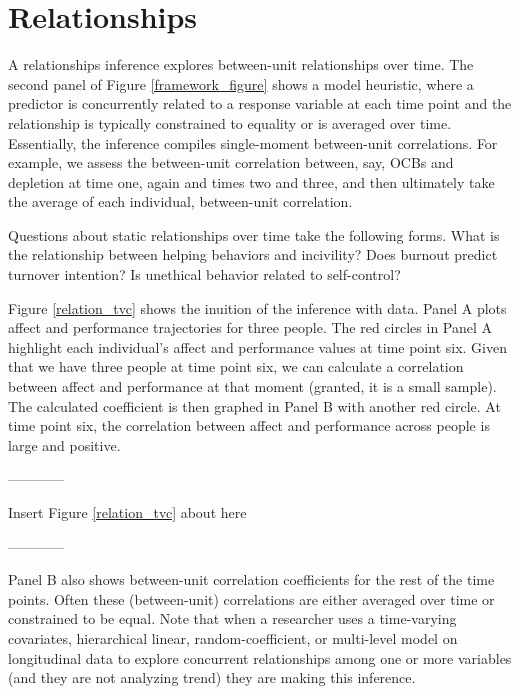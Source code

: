 \documentclass[english,,man]{apa6}
\theoremstyle{definition}
\theoremstyle{definition}
\theoremstyle{definition}
\theoremstyle{remark}
\begin{document}
\hypertarget{relationships}{%
\section{Relationships}\label{relationships}}

A relationships inference explores between-unit relationships over time.
The second panel of Figure \ref{framework_figure} shows a model
heuristic, where a predictor is concurrently related to a response
variable at each time point and the relationship is typically
constrained to equality or is averaged over time. Essentially, the
inference compiles single-moment between-unit correlations. For example,
we assess the between-unit correlation between, say, OCBs and depletion
at time one, again and times two and three, and then ultimately take the
average of each individual, between-unit correlation.

Questions about static relationships over time take the following forms.
What is the relationship between helping behaviors and incivility? Does
burnout predict turnover intention? Is unethical behavior related to
self-control?

Figure \ref{relation_tvc} shows the inuition of the inference with data.
Panel A plots affect and performance trajectories for three people. The
red circles in Panel A highlight each individual's affect and
performance values at time point six. Given that we have three people at
time point six, we can calculate a correlation between affect and
performance at that moment (granted, it is a small sample). The
calculated coefficient is then graphed in Panel B with another red
circle. At time point six, the correlation between affect and
performance across people is large and positive.

\begin{center}

------------

Insert Figure \ref{relation_tvc} about here

------------

\end{center}

Panel B also shows between-unit correlation coefficients for the rest of
the time points. Often these (between-unit) correlations are either
averaged over time or constrained to be equal. Note that when a
researcher uses a time-varying covariates, hierarchical linear,
random-coefficient, or multi-level model on longitudinal data to explore
concurrent relationships among one or more variables (and they are not
analyzing trend) they are making this inference.
\end{document}

